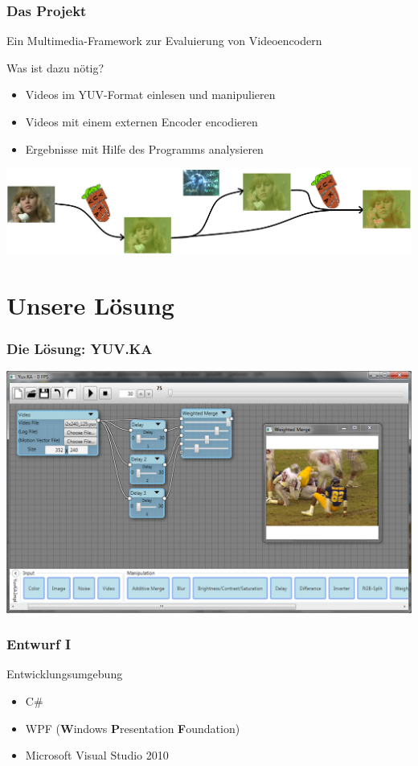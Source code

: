 \documentclass[t]{beamer}
\begin{document}
\begin{frame}
	\frametitle{Das Projekt}
	\begin{center}
		Ein Multimedia-Framework zur Evaluierung von Videoencodern	
	\end{center}
	 Was ist dazu nötig? \newline
	\begin{itemize}
		\item<1-> Videos im YUV-Format einlesen und manipulieren
		\item<1-> Videos mit einem externen Encoder encodieren
		\item<1-> Ergebnisse mit Hilfe des Programms analysieren
	\end{itemize}
	\includegraphics[scale=.34]{YuvKA-Workchart.png}
\end{frame}

\section{Unsere Lösung}
\begin{frame}
	\frametitle{Die Lösung: YUV.KA}
	\begin{center}
		\includegraphics[height=.9\textheight]{startup_screenshot.png}
	\end{center}
\end{frame}

\begin{frame}
	\frametitle{Entwurf I}
	
	Entwicklungsumgebung ~\\
	\begin{itemize}
		\item<+-> C\#
		\item<+-> WPF (\textbf{W}indows \textbf{P}resentation \textbf{F}oundation)
		\item<+-> Microsoft Visual Studio 2010
	\end{itemize}
\end{frame}
\end{document}
